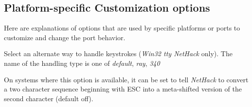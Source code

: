 \subsection*{Platform-specific Customization options}

Here are explanations of options that are used by specific platforms
or ports to customize and change the port behavior.

\blist{}
\item[\ib{altkeyhandling}]
Select an alternate way to handle keystrokes ({\it Win32 tty\/ NetHack\/} only).
The name of the handling type is one of {\it default}, {\it ray}, {\it 340}
\item[\ib{altmeta}]
On systems where this option is available, it can be
set to tell {\it NetHack\/} to convert a two character sequence beginning with
ESC into a meta-shifted version of the second character (default off).

